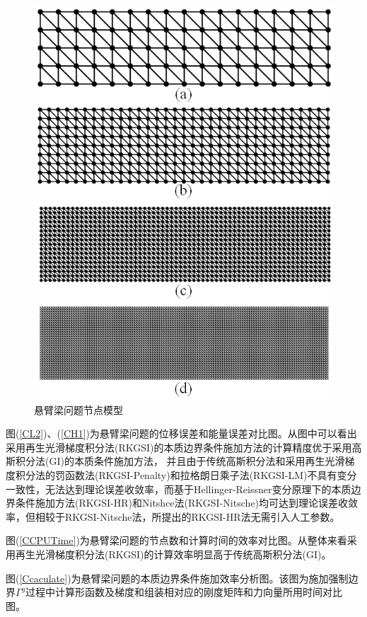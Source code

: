 \begin{figure}[H]
    \centering
    \includegraphics[scale=0.7]{figure/E/cantilever/cantilever.mesh.png}
    \caption{悬臂梁问题节点模型}\label{cantilever.mesh}
\end{figure}
图(\ref{CL2})、(\ref{CH1})为悬臂梁问题的位移误差和能量误差对比图。从图中可以看出采用再生光滑梯度积分法(RKGSI)的本质边界条件施加方法的计算精度优于采用高斯积分法(GI)的本质条件施加方法，
并且由于传统高斯积分法和采用再生光滑梯度积分法的罚函数法(RKGSI-Penalty)和拉格朗日乘子法(RKGSI-LM)不具有变分一致性，无法达到理论误差收敛率，而基于Hellinger-Reissner变分原理下的本质边界条件施加方法(RKGSI-HR)和Nitshce法(RKGSI-Nitsche)均可达到理论误差收敛率，但相较于RKGSI-Nitsche法，所提出的RKGSI-HR法无需引入人工参数。\par
图(\ref{CCPUTime})为悬臂梁问题的节点数和计算时间的效率对比图。从整体来看采用再生光滑梯度积分法(RKGSI)的计算效率明显高于传统高斯积分法(GI)。\par
图(\ref{Ccaculate})为悬臂梁问题的本质边界条件施加效率分析图。该图为施加强制边界$\Gamma^g$过程中计算形函数及梯度和组装相对应的刚度矩阵和力向量所用时间对比图。
